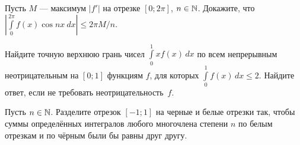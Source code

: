 \documentclass[a4paper, 11pt]{article}
\newcommand{\0}[1]{\overline{#1}}
\begin{document}
Пусть $M$ --- максимум $|f'|$
на отрезке $[0;2\pi]$, $n\in\mathbb{N}$. Докажите, что
$
\left|\int\limits_0^{2\pi}f(x)\cos nx \ \! dx\right|\leq2\pi M/n.
$

Найдите точную верхнюю грань чисел $\int\limits_0^1 xf(x)\,dx$ по всем
непрерывным неотрицательным на %
$[0;1]$ функциям
$f$, для которых $\int\limits_0^1 f(x)\,dx\leq2$.
Найдите ответ, если не требовать неотрицательность~$f$.





Пусть $n\in\mathbb{N}$. Разделите отрезок $[-1;1]$ на черные и белые отрезки так, чтобы
суммы определ\"енных интегралов любого многочлена степени $n$ по белым
отрезкам и по чёрным были бы равны друг другу.




\end{document}
